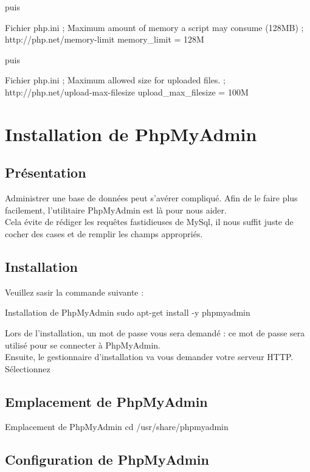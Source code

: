 {puis
\begin{Bash}{Fichier php.ini}
; Maximum amount of memory a script may consume (128MB)
; http://php.net/memory-limit
memory_limit = 128M
\end{Bash}

puis 
\begin{Bash}{Fichier php.ini}
; Maximum allowed size for uploaded files.
; http://php.net/upload-max-filesize
upload_max_filesize = 100M
\end{Bash}\chapter{Installation de PhpMyAdmin}

\section{Présentation}
Administrer une base de données peut s'avérer compliqué. Afin de le faire plus facilement, l'utilitaire PhpMyAdmin est là pour nous aider. \\
Cela évite de rédiger les requêtes fastidieuses de MySql, il nous suffit juste de cocher des cases et de remplir les champs appropriés. \\
\section{Installation}
Veuillez sasir la commande suivante : 
\begin{Bash}{Installation de PhpMyAdmin}
sudo apt-get install -y phpmyadmin
\end{Bash}

Lors de l’installation, un mot de passe vous sera demandé : ce mot de passe sera utilisé pour se connecter à PhpMyAdmin. \\

Ensuite, le gestionnaire d’installation va vous demander votre serveur HTTP.
Sélectionnez 

\section{Emplacement de PhpMyAdmin}

\begin{Bash}{Emplacement de PhpMyAdmin}
cd /usr/share/phpmyadmin
\end{Bash}


\section{Configuration de PhpMyAdmin}

}

